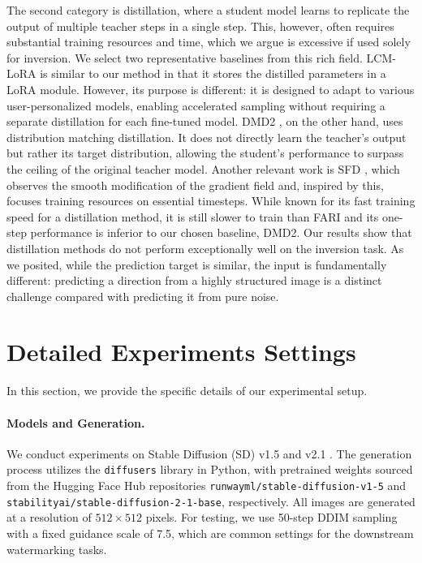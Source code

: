 \documentclass{article}
\begin{document}
The second category is distillation, where a student model learns to replicate the output of multiple teacher steps in a single step. This, however, often requires substantial training resources and time, which we argue is excessive if used solely for inversion. We select two representative baselines from this rich field. LCM-LoRA \citep{lcmlora2023} is similar to our method in that it stores the distilled parameters in a LoRA \citep{lora2022} module. However, its purpose is different: it is designed to adapt to various user-personalized models, enabling accelerated sampling without requiring a separate distillation for each fine-tuned model. DMD2 \citep{dmd2_2024}, on the other hand, uses distribution matching distillation. It does not directly learn the teacher's output but rather its target distribution, allowing the student's performance to surpass the ceiling of the original teacher model. Another relevant work is SFD \citep{sfd2024}, which observes the smooth modification of the gradient field and, inspired by this, focuses training resources on essential timesteps. While known for its fast training speed for a distillation method, it is still slower to train than FARI and its one-step performance is inferior to our chosen baseline, DMD2. Our results show that distillation methods do not perform exceptionally well on the inversion task. As we posited, while the prediction target is similar, the input is fundamentally different: predicting a direction from a highly structured image is a distinct challenge compared with predicting it from pure noise.

\section{Detailed Experiments Settings}
\label{sec:app_exp_set}

In this section, we provide the specific details of our experimental setup.

\paragraph{Models and Generation.}
We conduct experiments on Stable Diffusion (SD) v1.5 and v2.1 \citep{ldm_2022}. The generation process utilizes the \texttt{diffusers} library in Python, with pretrained weights sourced from the Hugging Face Hub repositories \texttt{runwayml/stable-diffusion-v1-5} and \texttt{stabilityai/stable-diffusion-2-1-base}, respectively. All images are generated at a resolution of $512 \times 512$ pixels. For testing, we use 50-step DDIM sampling with a fixed guidance scale of 7.5, which are common settings for the downstream watermarking tasks.
\end{document}
